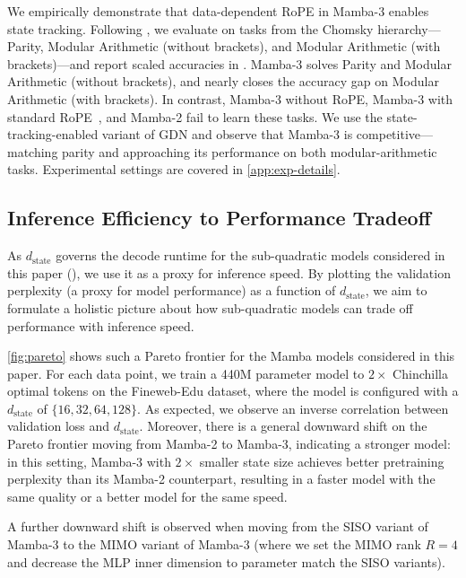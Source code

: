 \documentclass{article}
\newcommand{\citep}{\parencite}
\newcommand{\citet}{\textcite}
\theoremstyle{plain}
\theoremstyle{definition}
\theoremstyle{remark}
\begin{document}
We empirically demonstrate that data-dependent RoPE in Mamba-3 enables state tracking.
Following \citet{grazzi2025unlockingstatetrackinglinearrnns}, we evaluate on tasks from the Chomsky hierarchy---Parity, Modular Arithmetic (without brackets), and Modular Arithmetic (with brackets)---and report scaled accuracies in .
Mamba-3 solves Parity and Modular Arithmetic (without brackets), and nearly closes the accuracy gap on Modular Arithmetic (with brackets).
In contrast, Mamba-3 without RoPE, Mamba-3 with standard RoPE~\citep{su2023roformerenhancedtransformerrotary}, and Mamba-2 fail to learn these tasks.
We use the state-tracking-enabled variant of GDN and observe that Mamba-3 is competitive---matching parity and approaching its performance on both modular-arithmetic tasks. Experimental settings are covered in \cref{app:exp-details}.

\subsection{Inference Efficiency to Performance Tradeoff}
\label{sec:exp:pareto}

\latencytable

As $d_\text{state}$ governs the decode runtime for the sub-quadratic models considered in this paper (), we use it as a proxy for inference speed.
By plotting the validation perplexity (a proxy for model performance) as a function of $d_\text{state}$, we aim to formulate a holistic picture about how sub-quadratic models can trade off performance with inference speed. 

\cref{fig:pareto} shows such a Pareto frontier for the Mamba models considered in this paper.
For each data point, we train a 440M parameter model to $2\times$ Chinchilla optimal tokens on the Fineweb-Edu dataset, where the model is configured with a $d_\text{state}$ of $\{16, 32, 64, 128\}$.
As expected, we observe an inverse correlation between validation loss and $d_\text{state}$.
Moreover, there is a general downward shift on the Pareto frontier moving from Mamba-2 to Mamba-3, indicating a stronger model:
in this setting, Mamba-3 with $2\times$ smaller state size achieves better pretraining perplexity than its Mamba-2 counterpart, resulting in a faster model with the same quality or a better model for the same speed.

A further downward shift is observed when moving from the SISO variant of Mamba-3 to the MIMO variant of Mamba-3 (where we set the MIMO rank $R = 4$ and decrease the MLP inner dimension to parameter match the SISO variants).
\end{document}
